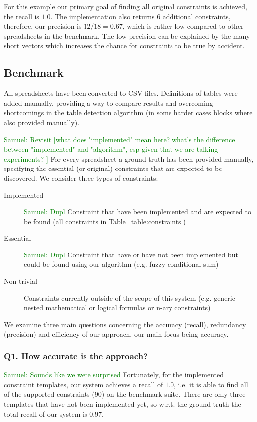 \documentclass{IEEEtran}
\newcommand{\samuel}[1]{\textcolor{green}{{\sc Samuel:} #1}\xspace}
\theoremstyle{definition}
\begin{document}
For this example our primary goal of finding all original constraints is achieved, the recall is $1.0$.
The implementation also returns 6 additional constraints, therefore, our precision is $12/18 = 0.67$, which is rather low compared to other spreadsheets in the benchmark.
The low precision can be explained by the many short vectors which increases the chance for constraints to be true by accident.






\subsection{Benchmark}
All spreadsheets have been converted to CSV files.
Definitions of tables were added manually, providing a way to compare results and overcoming shortcomings in the table detection algorithm (in some harder cases blocks where also provided manually).

\samuel{Revisit [what does "implemented" mean here? what's the difference between "implemented" and "algorithm", esp given that we are talking experiments? ]}
For every spreadsheet a ground-truth has been provided manually, specifying the essential (or original) constraints that are expected to be discovered.
We consider three types of constraints:
\begin{description}
  \item[Implemented] \samuel{Dupl} Constraint that have been implemented and are expected to be found (all constraints in Table~\ref{table:constraints})
  \item[Essential] \samuel{Dupl} Constraint that have or have not been implemented but could be found using our algorithm (e.g. fuzzy conditional sum)
  \item[Non-trivial] Constraints currently outside of the scope of this system (e.g. generic nested mathematical or logical formulas or n-ary constraints)
\end{description}

We examine three main questions concerning the accuracy (recall), redundancy (precision) and efficiency of our approach, our main focus being accuracy.





\subsubsection*{Q1. How accurate is the approach?}
\samuel{Sounds like we were surprised}
Fortunately, for the implemented constraint templates, our system achieves a recall of $1.0$, i.e. it is able to find all of the supported constraints (90) on the benchmark suite.
There are only three templates that have not been implemented yet, so w.r.t. the ground truth the total recall of our system is $0.97$.
\end{document}
